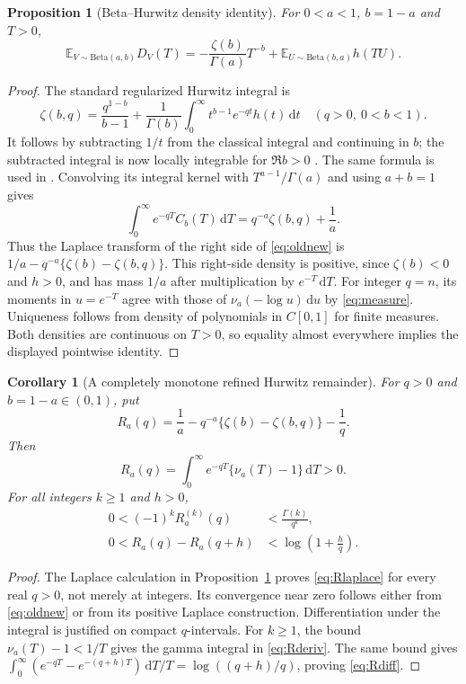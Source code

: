 \documentclass[11pt]{article}
\numberwithin{equation}{section}
\newtheorem{proposition}[theorem]{Proposition}
\newtheorem{corollary}[theorem]{Corollary}
\theoremstyle{definition}\newtheorem{definition}[theorem]{Definition}
\theoremstyle{remark}\newtheorem{remark}[theorem]{Remark}
\newcommand{\dd}{\,\mathrm d}
\newcommand{\E}{\mathbb E}
\begin{document}
\begin{proposition}[Beta--Hurwitz density identity]\label{prop:hurwitzdensity}
For $0<a<1$, $b=1-a$ and $T>0$,
\begin{equation}\label{eq:oldnew}
 \E_{V\sim\mathrm{Beta}(a,b)}D_V(T)
 =-\frac{\zeta(b)}{\Gamma(a)}T^{-b}
   +\E_{U\sim\mathrm{Beta}(b,a)}h(TU).
\end{equation}
\end{proposition}
\begin{proof}
The standard regularized Hurwitz integral is
\begin{equation}\label{eq:hurwitzreg}
 \zeta(b,q)=\frac{q^{1-b}}{b-1}
 +\frac1{\Gamma(b)}\int_0^\infty t^{b-1}e^{-qt}h(t)\dd t
 \quad(q>0,\ 0<b<1).
\end{equation}
It follows by subtracting $1/t$ from the classical integral and
continuing in $b$; the subtracted integral is now locally integrable
for $\Re b>0$ \cite{dlmfhurwitz}. The same formula is used in
\cite{threshold}.
Convolving its integral kernel with $T^{a-1}/\Gamma(a)$ and using
$a+b=1$ gives
\[
 \int_0^\infty e^{-qT}C_b(T)\dd T
 =q^{-a}\zeta(b,q)+\frac1a.
\]
Thus the Laplace transform of the right side of \eqref{eq:oldnew}
is $1/a-q^{-a}\{\zeta(b)-\zeta(b,q)\}$. This right-side density
is positive, since $\zeta(b)<0$ and $h>0$, and has mass $1/a$ after
multiplication by $e^{-T}\dd T$. For integer $q=n$, its moments in
$u=e^{-T}$ agree with those of $\nu_a(-\log u)\dd u$ by
\eqref{eq:measure}. Uniqueness follows from density of polynomials in
$C[0,1]$ for finite measures. Both densities are continuous on
$T>0$, so equality almost everywhere implies the displayed pointwise
identity.
\end{proof}

\begin{corollary}[A completely monotone refined Hurwitz remainder]
\label{cor:Hurwitz}
For $q>0$ and $b=1-a\in(0,1)$, put
\begin{equation}\label{eq:Rq}
 R_a(q)=\frac1a-q^{-a}\{\zeta(b)-\zeta(b,q)\}-\frac1q.
\end{equation}
Then
\begin{equation}\label{eq:Rlaplace}
 R_a(q)=\int_0^\infty e^{-qT}\{\nu_a(T)-1\}\dd T>0.
\end{equation}
For all integers $k\ge1$ and $h>0$,
\begin{align}
 0<(-1)^kR_a^{(k)}(q)&<\frac{\Gamma(k)}{q^k},\label{eq:Rderiv}\\
 0<R_a(q)-R_a(q+h)&<\log\left(1+\frac hq\right).\label{eq:Rdiff}
\end{align}
\end{corollary}
\begin{proof}
The Laplace calculation in Proposition~\ref{prop:hurwitzdensity} proves
\eqref{eq:Rlaplace} for every real $q>0$, not merely at integers.
Its convergence near zero follows either from \eqref{eq:oldnew} or
from its positive Laplace construction. Differentiation under the
integral is justified on compact $q$-intervals. For $k\ge1$, the bound
$\nu_a(T)-1<1/T$ gives the gamma integral in \eqref{eq:Rderiv}.
The same bound gives
$\int_0^\infty(e^{-qT}-e^{-(q+h)T})\dd T/T=
\log((q+h)/q)$, proving \eqref{eq:Rdiff}.
\end{proof}
\end{document}
